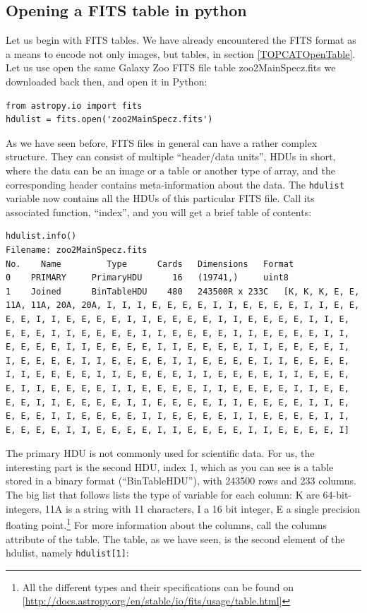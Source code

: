 \documentclass[twocolumn,apj]{openjournal}
\begin{document}
\subsection{Opening a FITS table in python}
\label{FITSTablePython}

Let us begin with FITS tables. We have already encountered the FITS format as a means to encode not only images, but tables, in section \ref{TOPCATOpenTable}. Let us use open the same Galaxy Zoo FITS file table zoo2MainSpecz.fits we downloaded back then, and open it in Python:
\begin{lstlisting}
from astropy.io import fits
hdulist = fits.open('zoo2MainSpecz.fits')
\end{lstlisting}
As we have seen before, FITS files in general can have a rather complex structure. They can consist of multiple ``header/data units'', HDUs in short, where the data can be an image or a table or another type of array, and the corresponding header contains meta-information about the data. The \verb|hdulist| variable now contains all the HDUs of this particular FITS file. Call its associated function, ``index'', and you will get a brief table of contents:
\begin{lstlisting}
hdulist.info()
Filename: zoo2MainSpecz.fits
No.    Name         Type      Cards   Dimensions   Format
0    PRIMARY     PrimaryHDU      16   (19741,)     uint8   
1    Joined      BinTableHDU    480   243500R x 233C   [K, K, K, E, E, 11A, 11A, 20A, 20A, I, I, I, E, E, E, E, I, I, E, E, E, E, I, I, E, E, E, E, I, I, E, E, E, E, I, I, E, E, E, E, I, I, E, E, E, E, I, I, E, E, E, E, I, I, E, E, E, E, I, I, E, E, E, E, I, I, E, E, E, E, I, I, E, E, E, E, I, I, E, E, E, E, I, I, E, E, E, E, I, I, E, E, E, E, I, I, E, E, E, E, I, I, E, E, E, E, I, I, E, E, E, E, I, I, E, E, E, E, I, I, E, E, E, E, I, I, E, E, E, E, I, I, E, E, E, E, I, I, E, E, E, E, I, I, E, E, E, E, I, I, E, E, E, E, I, I, E, E, E, E, I, I, E, E, E, E, I, I, E, E, E, E, I, I, E, E, E, E, I, I, E, E, E, E, I, I, E, E, E, E, I, I, E, E, E, E, I, I, E, E, E, E, I, I, E, E, E, E, I, I, E, E, E, E, I, I, E, E, E, E, I, I, E, E, E, E, I, I, E, E, E, E, I]   
\end{lstlisting}
The primary HDU is not commonly used for scientific data. For us, the interesting part is the second HDU, index 1, which as you can see is a table stored in a binary format (``BinTableHDU''), with 243500 rows and 233 columns. The big list that follows lists the type of variable for each column: K are 64-bit-integers, 11A is a string with 11 characters, I a 16 bit integer, E a single precision floating point.\footnote{All the different types and their specifications can be found on [\href{http://docs.astropy.org/en/stable/io/fits/usage/table.html}{http://docs.astropy.org/en/stable/io/fits/usage/table.html}]} For more information about the columns, call the columns attribute of the table. The table, as we have seen, is the second element of the hdulist, namely \verb|hdulist[1]|:
\end{document}
